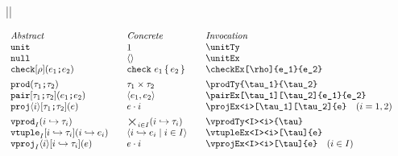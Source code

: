 \documentclass[11pt]{article}
\begin{document}
\clearpage
{}

\begin{figure}
  ||
  \begin{small}
    \begin{displaymath}
      \begin{array}{l@{\qquad}l@{\qquad}l@{\qquad}l}
        \textit{Abstract} & \textit{Concrete} & \textit{Invocation} \\
        \unitTy                           & \unitTy*                 & \verb|\unitTy|                                \\
        \unitEx                           & \unitEx*                 & \verb|\unitEx|                                \\
        \checkEx[\rho]{e_1}{e_2}          & \checkEx*{e_1}{e_2}       & \verb|\checkEx[\rho]{e_1}{e_2}|                \\[1ex]
        
        \prodTy{\tau_1}{\tau_2}           & \prodTy*{\tau_1}{\tau_2} & \verb|\prodTy{\tau_1}{\tau_2}|                \\
        \pairEx[\tau_1][\tau_2]{e_1}{e_2} & \pairEx*{e_1}{e_2}       & \verb|\pairEx[\tau_1][\tau_2]{e_1}{e_2}|      \\
        \projEx<i>[\tau_1][\tau_2]{e}     & \projEx*<i>{e}           & \verb|\projEx<i>[\tau_1][\tau_2]{e}| \quad (i=1,2)  \\[1ex]

        \vprodTy<I><i>{\tau}              & \vprodTy*<I><i>{\tau}          & \verb|\vprodTy<I><i>{\tau}|                   \\
        \vtupleEx<I><i>[\tau]{e}          & \vtupleEx*<I><i>{e}         & \verb|\vtupleEx<I><i>[\tau]{e}|                  \\
        \vprojEx<I><i>[\tau]{e}           & \vprojEx*<I><i>{e}          & \verb|\vprojEx<I><i>[\tau]{e}| \quad (i\in I) \\[1ex]


\end{array}
\end{displaymath}
\end{small}
\end{figure}
\end{document}
